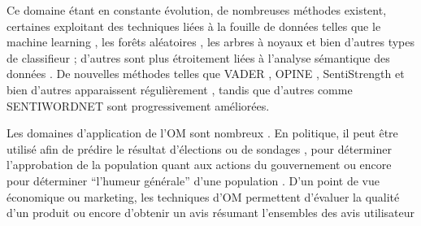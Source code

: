 \documentclass[8pt]{article}
\begin{document}
\begin{multicols}{2}
\par Ce domaine étant en constante évolution, de nombreuses méthodes existent, certaines exploitant des techniques liées à la fouille de données telles que le machine learning \cite{ressource28} \cite{ressource1}, les forêts aléatoires \cite{ressource18}, les arbres à noyaux \cite{ressource30} \cite{ressource17} et bien d’autres types de classifieur \cite{ressource4} \cite{ressource9} \cite{ressource10} \cite{ressource15}; d’autres sont plus étroitement liées à l’analyse sémantique des données \cite{ressource16} \cite{ressource11} \cite{ressource12} \cite{ressource7}.
De nouvelles méthodes telles que VADER \cite{ressource26}, OPINE \cite{ressource9}, SentiStrength \cite{ressource22} et bien d’autres apparaissent régulièrement \cite{ressource17} \cite{ressource16} \cite{ressource13}, tandis que d’autres comme SENTIWORDNET \cite{ressource12} \cite{ressource7} sont progressivement améliorées.

Les domaines d’application de l’OM sont nombreux \cite{ressource20}. En politique, il peut être utilisé afin de prédire le résultat d'élections ou de sondages \cite{ressource11} \cite{ressource14}, pour déterminer l’approbation de la population quant aux actions du gouvernement \cite{ressource14} ou encore pour déterminer “l’humeur générale” d’une population \cite{ressource27} \cite{ressource25} \cite{ressource24}.
D’un point de vue économique ou marketing, les techniques d’OM permettent d’évaluer la qualité d’un produit \cite{ressource18} \cite{ressource9} \cite{ressource8} ou encore d’obtenir un avis résumant l’ensembles des avis utilisateur \cite{ressource3}


\end{multicols}
\end{document}
